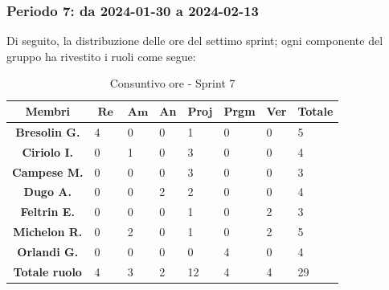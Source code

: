 \documentclass[10pt, a4paper]{article}
\begin{document}
\subsubsection{Periodo 7: da 2024-01-30 a 2024-02-13}
Di seguito, la distribuzione delle ore del settimo sprint; ogni componente del gruppo ha rivestito i ruoli come segue:
\begin{table}[H]
    \begin{tabularx}{\textwidth}{c|X|X|X|X|X|X|X}
        \textbf{Membri} & $\operatorname{\textbf{Re}}$ & $\mathrm{\textbf{Am}}$ & \textbf{An} & \textbf{Proj} & \textbf{Prgm} & \textbf{Ver} & \textbf{Totale} \\
        \hline
        \textbf{Bresolin G.} & 4 & 0 & 0 & 1 & 0 & 0 & 5 \\
        \hline
        \textbf{Ciriolo I.}  & 0 & 1 & 0 & 3 & 0 & 0 & 4 \\
        \hline
        \textbf{Campese M.}  & 0 & 0 & 0 & 3 & 0 & 0 & 3 \\
        \hline
        \textbf{Dugo A.}     & 0 & 0 & 2 & 2 & 0 & 0 & 4 \\
        \hline
        \textbf{Feltrin E.}  & 0 & 0 & 0 & 1 & 0 & 2 & 3 \\
        \hline
        \textbf{Michelon R.} & 0 & 2 & 0 & 1 & 0 & 2 & 5 \\
        \hline
        \textbf{Orlandi G.}  & 0 & 0 & 0 & 0 & 4 & 0 & 4 \\
        \hline
        \textbf{Totale ruolo} & 4 & 3 & 2 & 12 & 4 & 4 & 29 \\
    \end{tabularx}
    \caption{Consuntivo ore - Sprint 7}
\end{table}
\end{document}
